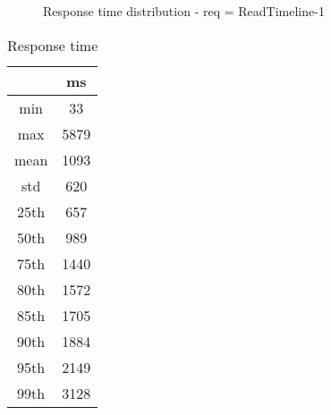 \begin{minipage}{0.75\linewidth}
\begin{figure}[h]
\begin{adjustbox}{max width=1.0\linewidth, keepaspectratio}
  \end{adjustbox}
  \caption{Response time distribution - req = ReadTimeline-1}
\end{figure}
\end{minipage}\hfill\begin{minipage}{0.18\linewidth}
\begin{table}[h]
\begin{tabular}{|cc|}
\hline
\textbf{} & \textbf{ms}\\ \hline
 \Xhline{0.005\arrayrulewidth}
min & 33\\
 \Xhline{0.005\arrayrulewidth}
max & 5879\\
 \Xhline{0.005\arrayrulewidth}
mean & 1093\\
 \Xhline{0.005\arrayrulewidth}
std & 620\\
\hline
\hline
 \Xhline{0.005\arrayrulewidth}
25th & 657\\
 \Xhline{0.005\arrayrulewidth}
50th & 989\\
 \Xhline{0.005\arrayrulewidth}
75th & 1440\\
 \Xhline{0.005\arrayrulewidth}
80th & 1572\\
 \Xhline{0.005\arrayrulewidth}
85th & 1705\\
 \Xhline{0.005\arrayrulewidth}
90th & 1884\\
 \Xhline{0.005\arrayrulewidth}
95th & 2149\\
 \Xhline{0.005\arrayrulewidth}
99th & 3128\\
\hline
\end{tabular}
\caption{Response time}
\end{table}
\end{minipage}\hfill
